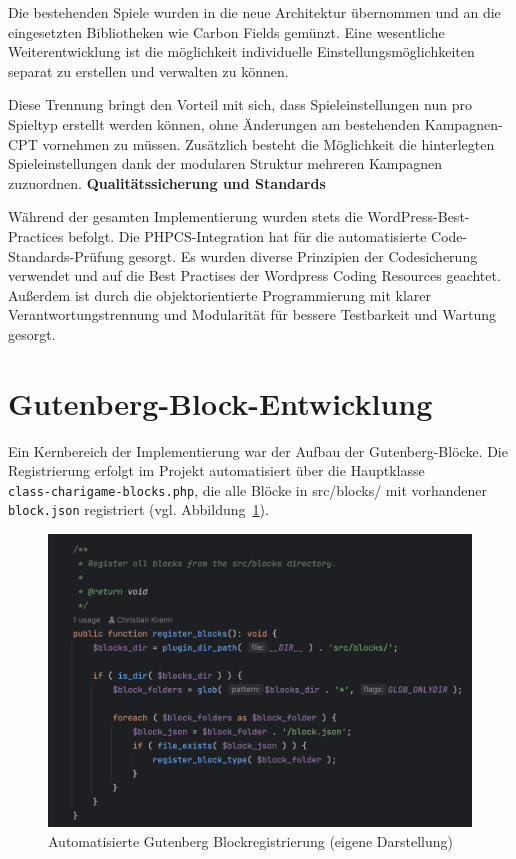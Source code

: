 Die bestehenden Spiele wurden in die neue Architektur übernommen und an die eingesetzten Bibliotheken wie Carbon Fields gemünzt.
Eine wesentliche Weiterentwicklung ist die möglichkeit individuelle Einstellungsmöglichkeiten separat zu erstellen und verwalten zu können.

Diese Trennung bringt den Vorteil mit sich, dass Spieleinstellungen nun pro Spieltyp erstellt werden können, ohne Änderungen am bestehenden Kampagnen-CPT vornehmen zu müssen.
Zusätzlich besteht die Möglichkeit die hinterlegten Spieleinstellungen dank der modularen Struktur mehreren Kampagnen zuzuordnen.
\newpage
\textbf{Qualitätssicherung und Standards}

Während der gesamten Implementierung wurden stets die WordPress-Best-Practices befolgt.
Die PHPCS-Integration hat für die automatisierte Code-Standards-Prüfung gesorgt.
Es wurden diverse Prinzipien der Codesicherung verwendet und auf die Best Practises der Wordpress Coding Resources geachtet.
Außerdem ist durch die objektorientierte Programmierung mit klarer Verantwortungstrennung und Modularität für bessere Testbarkeit und Wartung gesorgt.

\section{Gutenberg-Block-Entwicklung}
Ein Kernbereich der Implementierung war der Aufbau der Gutenberg-Blöcke.
Die Registrierung erfolgt im Projekt automatisiert über die Hauptklasse\\ \texttt{class-charigame-blocks.php}, die alle Blöcke in src/blocks/ mit vorhandener\\ \texttt{block.json} registriert (vgl. Abbildung~\ref{fig:new-block-reg}).

\begin{figure}[H]
    \centering
    \includegraphics[width=1.0\textwidth]{images/new_blocks}
    \caption{Automatisierte Gutenberg Blockregistrierung (eigene Darstellung)}
    \label{fig:new-block-reg}
\end{figure}

